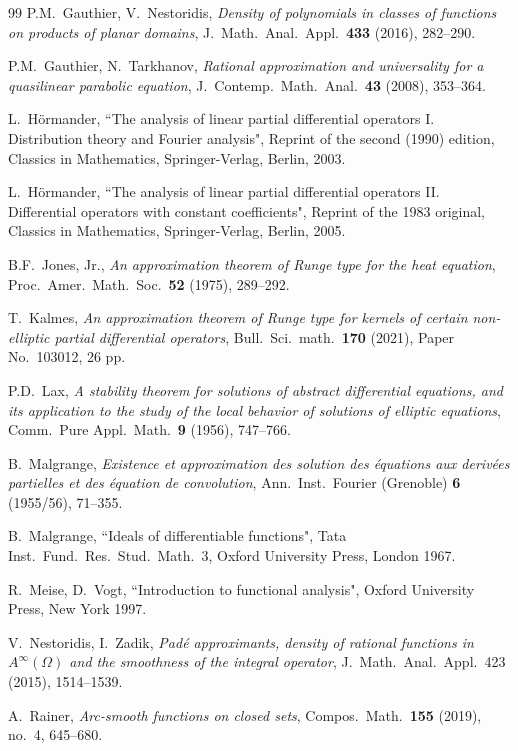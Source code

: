 \documentclass[10pt,leqno]{amsart}
\theoremstyle{definition}
\begin{document}
{\begin{thebibliography}{99}
 P.M.~Gauthier, V.~Nestoridis,
\emph{Density of polynomials in classes of functions on products of planar domains},
J.~Math.~Anal.~Appl.~{\bf 433} (2016), 282--290.

 P.M.~Gauthier, N.~Tarkhanov,
\emph{Rational approximation and universality for a quasilinear parabolic equation},
J.~Contemp.~Math.~Anal.~{\bf 43} (2008), 353--364.

 L.~H\"ormander, 
``The analysis of linear partial differential operators I.
Distribution theory and Fourier analysis", 
Reprint of the second (1990) edition, Classics in Mathematics, Springer-Verlag, Berlin, 2003. 

 L.~H\"ormander, 
``The analysis of linear partial differential operators II.
Differential operators with constant coefficients", 
Reprint of the 1983 original, Classics in Mathematics, Springer-Verlag, Berlin, 2005.

B.F.~Jones, Jr.,
\emph{An approximation theorem of Runge type for the heat equation},
Proc.~Amer.~Math.~Soc.~{\bf 52} (1975), 289--292.

 T.~Kalmes,
\emph{An approximation theorem of Runge type for kernels of certain non-elliptic partial differential operators},
Bull.~Sci.~math.~{\bf 170} (2021), Paper No.~103012, 26 pp.

P.D.~Lax, \emph{A stability theorem for solutions of abstract differential equations, and its application to the study of the local behavior of solutions of elliptic equations},
Comm.~Pure Appl.~Math.~{\bf 9} (1956), 747--766.

B.~Malgrange,
\emph{Existence et approximation des solution des \'equations aux deriv\'ees partielles et des \'equation de convolution},
Ann.~Inst.~Fourier (Grenoble) {\bf 6} (1955/56), 71--355.

B.~Malgrange,
``Ideals of differentiable functions",
Tata Inst.~Fund.~Res.~Stud.~Math.~3, Oxford University Press, London 1967.

 R.~Meise, D.~Vogt,
``Introduction to functional analysis",
Oxford University Press, New York 1997.

 V.~Nestoridis, I.~Zadik,
\emph{Pad\'e approximants, density of rational functions in $A^\infty(\Omega)$ and the smoothness of the integral operator},
J.~Math.~Anal.~Appl.~423 (2015), 1514--1539.

 A.~Rainer,
\emph{Arc-smooth functions on closed sets}, 
Compos.~Math.~{\bf 155} (2019), no.~4, 645--680.


\end{thebibliography}}
\end{document}
